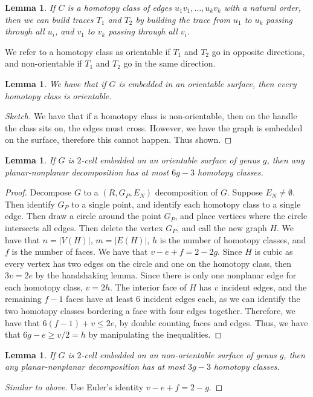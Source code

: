 \documentclass[]{report}
\newtheorem{lemma}[theorem]{Lemma}
\theoremstyle{definition}
\numberwithin{theorem}{section}
\numberwithin{equation}{section}
\begin{document}
\begin{lemma}
	If $C$ is a homotopy class of edges $u_1v_1, ..., u_kv_k$ with a natural order, then we can build traces $T_1$ and $T_2$ by building the trace from $u_1$ to $u_k$ passing through all $u_i$, and $v_1$ to $v_k$ passing through all $v_i$. 
\end{lemma}
We refer to a homotopy class as orientable if $T_1$ and $T_2$ go in opposite directions, and non-orientable if $T_1$ and $T_2$ go in the same direction.

\begin{lemma}
	We have that if $G$ is embedded in an orientable surface, then every homotopy class is orientable.
\end{lemma}
\begin{proof}[Sketch]
	We have that if a homotopy class is non-orientable, then on the handle the class sits on, the edges must cross. However, we have the graph is embedded on the surface, therefore this cannot happen. Thus shown. 
\end{proof}

\begin{lemma}
	If $G$ is $2$-cell embedded on an orientable surface of genus $g$, then any planar-nonplanar decomposition has at most $6g-3$ homotopy classes. 
\end{lemma}
\begin{proof}
	Decompose $G$ to a $(R, G_P, E_N)$ decomposition of $G$. Suppose $E_N \neq \emptyset$. Then identify $G_P$ to a single point, and identify each homotopy class to a single edge. Then draw a circle around the point $G_P$, and place vertices where the circle intersects all edges. Then delete the vertex $G_P$, and call the new graph $H$. We have that $n = |V(H)|$, $m = |E(H)|$, $h$ is the number of homotopy classes, and $f$ is the number of faces. We have that $v - e + f = 2 - 2g$. Since $H$ is cubic as every vertex has two edges on the circle and one on the homotopy class, then $3v = 2e$ by the handshaking lemma. Since there is only one nonplanar edge for each homotopy class, $v = 2h$. The interior face of $H$ has $v$ incident edges, and the remaining $f-1$ faces have at least 6 incident edges each, as we can identify the two homotopy classes bordering a face with four edges together. Therefore, we have that $6(f-1) + v \leq 2e$, by double counting faces and edges. Thus, we have that $6g - e \geq v/2 = h$ by manipulating the inequalities. 
\end{proof}

\begin{lemma}
	If $G$ is $2$-cell embedded on an non-orientable surface of genus $g$, then any planar-nonplanar decomposition has at most $3g-3$ homotopy classes. 
\end{lemma}
\begin{proof}[Similar to above]
	Use Euler's identity $v - e + f = 2-g$. 
\end{proof}
\end{document}
